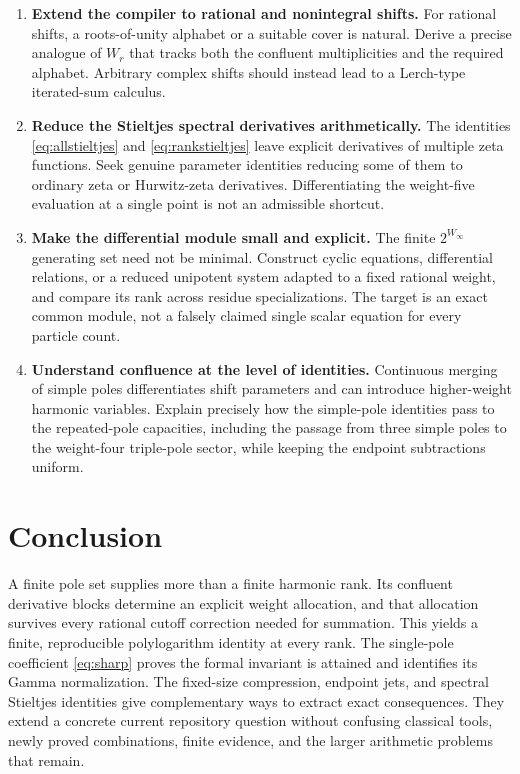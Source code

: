 \documentclass[11pt,letterpaper]{article}
\numberwithin{equation}{section}
\theoremstyle{definition}\newtheorem{definition}[theorem]{Definition}
\theoremstyle{remark}\newtheorem{remark}[theorem]{Remark}
\begin{document}
\begin{enumerate}[label=\textbf{Q\arabic*.},leftmargin=*]
\item \textbf{Extend the compiler to rational and nonintegral shifts.}
For rational shifts, a roots-of-unity alphabet or a suitable cover is
natural. Derive a precise analogue of $W_r$ that tracks both the
confluent multiplicities and the required alphabet. Arbitrary complex
shifts should instead lead to a Lerch-type iterated-sum calculus.

\item \textbf{Reduce the Stieltjes spectral derivatives arithmetically.}
The identities \eqref{eq:allstieltjes} and \eqref{eq:rankstieltjes}
leave explicit derivatives of multiple zeta functions. Seek genuine
parameter identities reducing some of them to ordinary zeta or
Hurwitz-zeta derivatives. Differentiating the weight-five evaluation
at a single point is not an admissible shortcut.

\item \textbf{Make the differential module small and explicit.}
The finite $2^{W_\infty}$ generating set need not be minimal. Construct
cyclic equations, differential relations, or a reduced unipotent
system adapted to a fixed rational weight, and compare its rank
across residue specializations. The target is an exact common module,
not a falsely claimed single scalar equation for every particle count.

\item \textbf{Understand confluence at the level of identities.}
Continuous merging of simple poles differentiates shift parameters
and can introduce higher-weight harmonic variables. Explain precisely
how the simple-pole identities pass to the repeated-pole capacities,
including the passage from three simple poles to the weight-four
triple-pole sector, while keeping the endpoint subtractions uniform.
\end{enumerate}

\section*{Conclusion}
A finite pole set supplies more than a finite harmonic rank. Its
confluent derivative blocks determine an explicit weight allocation,
and that allocation survives every rational cutoff correction needed
for summation. This yields a finite, reproducible polylogarithm identity
at every rank. The single-pole coefficient \eqref{eq:sharp} proves the
formal invariant is attained and identifies its Gamma normalization.
The fixed-size compression, endpoint jets, and spectral Stieltjes
identities give complementary ways to extract exact consequences.
They extend a concrete current repository question without confusing
classical tools, newly proved combinations, finite evidence, and the
larger arithmetic problems that remain.
\end{document}
